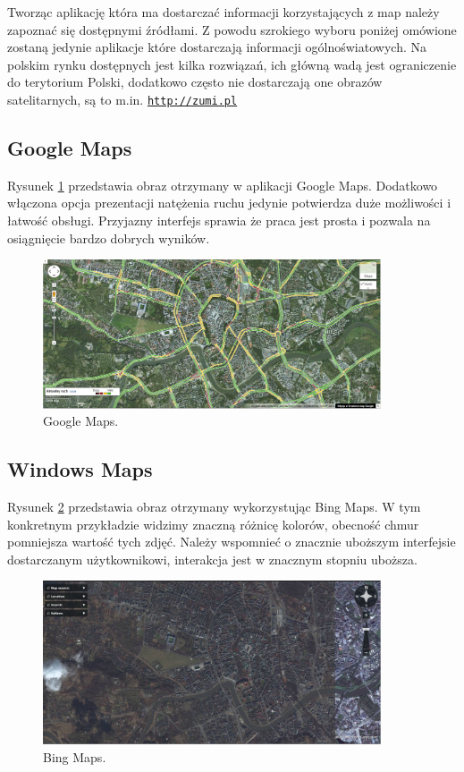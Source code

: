 Tworząc aplikację która ma dostarczać informacji korzystających z map należy zapoznać się dostępnymi źródłami. Z powodu szrokiego wyboru poniżej omówione zostaną jedynie aplikacje które dostarczają informacji ogólnoświatowych. Na polskim rynku dostępnych jest kilka rozwiązań, ich główną wadą jest ograniczenie do terytorium Polski, dodatkowo często nie dostarczają one obrazów satelitarnych, są to m.in. \underline{\texttt{http://zumi.pl}}


\subsection{Google Maps}
\label{subsec:Google Maps}
\nocite{googlemapsbegin}
Rysunek \ref{fig:googleMaps_1} przedstawia obraz otrzymany w aplikacji Google Maps. Dodatkowo włączona opcja prezentacji natężenia ruchu jedynie potwierdza duże możliwości i łatwość obsługi. Przyjazny interfejs sprawia że praca jest prosta i pozwala na osiągnięcie bardzo dobrych wyników.

\begin{figure}[H]
  \centering
    \includegraphics[width=100mm]{ge/gm_1.jpg}
  \caption{Google Maps.}
  \label{fig:googleMaps_1}
\end{figure}


\subsection{Windows Maps}
\label{subsec:Windows Maps}

Rysunek \ref{fig:bingMaps_1} przedstawia obraz otrzymany wykorzystując Bing Maps. W tym konkretnym przykładzie widzimy znaczną różnicę kolorów, obecność chmur pomniejsza wartość tych zdjęć. Należy wspomnieć o znacznie uboższym interfejsie dostarczanym użytkownikowi, interakcja jest w znacznym stopniu uboższa.

\begin{figure}[H]
  \centering
    \includegraphics[width=100mm]{ge/bing_1.jpg}
  \caption{Bing Maps.}
  \label{fig:bingMaps_1}
\end{figure}

